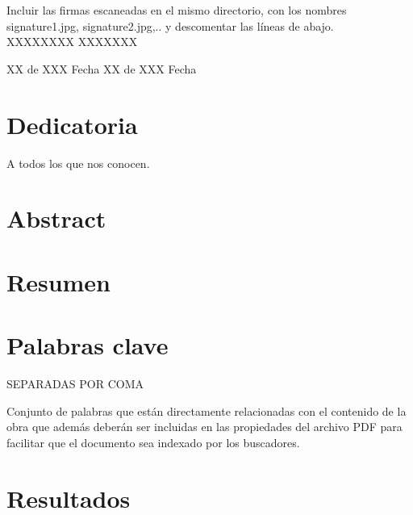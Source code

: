 \documentclass[12pt,a4paper,oneside]{book}
\begin{document}
 
\vspace{2cm}


\noindent Incluir las firmas escaneadas en el mismo directorio, con los nombres signature1.jpg, signature2.jpg,.. y descomentar las líneas de abajo.\\


XXXXXXXX \hfill XXXXXXX

XX de XXX Fecha \hfill  XX de XXX Fecha



\chapter*{Dedicatoria }

A todos los que nos conocen. 


\chapter*{Abstract}


\chapter*{Resumen}

\chapter*{Palabras clave}
SEPARADAS POR COMA

\vspace{1cm}

Conjunto de palabras que están directamente relacionadas con el contenido de la obra que además deberán ser incluidas en las
propiedades del archivo PDF para facilitar que el documento sea indexado por los buscadores.


\tableofcontents

\chapter{Resultados}
\lipsum[1-6]




\end{document}
